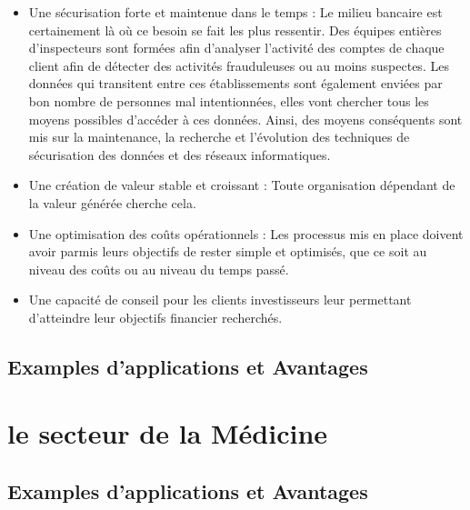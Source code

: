 \begin{itemize}

    \item Une sécurisation forte et maintenue dans le temps : \newline
    Le milieu bancaire est certainement là où ce besoin se fait les plus ressentir.
    Des équipes entières d'inspecteurs sont formées afin d'analyser
    l'activité des comptes de chaque client
    afin de détecter des activités frauduleuses ou au moins suspectes. \newline
    Les données qui transitent entre ces établissements sont également
    enviées par bon nombre de personnes mal intentionnées,
    elles vont chercher tous les moyens possibles d'accéder à ces données. Ainsi,
    des moyens conséquents sont mis sur la maintenance, la recherche et l'évolution
    des techniques de sécurisation des données et des réseaux informatiques. \newline

    \item Une création de valeur stable et croissant : \newline
    Toute organisation dépendant de la valeur générée cherche cela. \newline

    \item Une optimisation des coûts opérationnels : \newline
    Les processus mis en place doivent avoir parmis leurs objectifs de
    rester simple et optimisés, que ce soit au niveau des coûts
    ou au niveau du temps passé. \newline

    \item Une capacité de conseil pour les clients investisseurs leur permettant 
    d'atteindre leur objectifs financier recherchés. 
\end{itemize}
\subsection*{Examples d'applications et Avantages}


\section{le secteur de la Médicine}
\subsection{Examples d'applications et Avantages}

